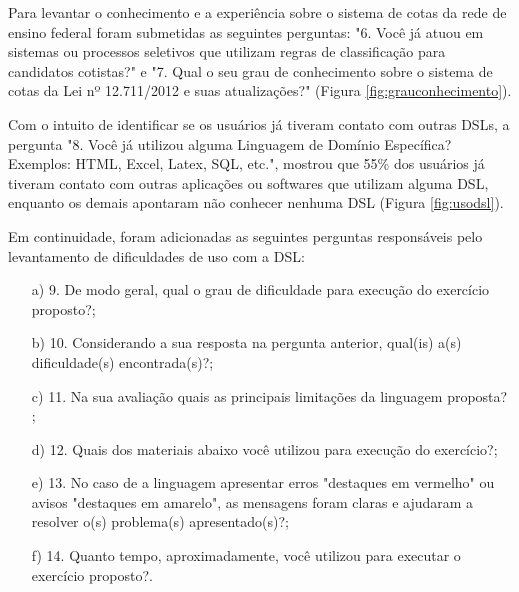 

\newpage
Para levantar o conhecimento e a experiência sobre o sistema de cotas da rede de ensino federal foram submetidas as seguintes perguntas: "6. Você já atuou em sistemas ou processos seletivos que utilizam regras de classificação para candidatos cotistas?" e "7. Qual o seu grau de conhecimento sobre o sistema de cotas da Lei nº 12.711/2012 e suas atualizações?" (Figura \ref{fig:grauconhecimento}).



Com o intuito de identificar se os usuários já tiveram contato com outras DSLs, a pergunta "8. Você já utilizou alguma Linguagem de Domínio Específica? Exemplos: HTML, Excel, Latex, SQL, etc.", mostrou que 55\% dos usuários já tiveram contato com outras aplicações ou softwares que utilizam alguma \gls{DSL}, enquanto os demais apontaram não conhecer nenhuma DSL (Figura \ref{fig:usodsl}).



\newpage
Em continuidade, foram adicionadas as seguintes perguntas responsáveis pelo levantamento de dificuldades de uso com a DSL:

\begin{enumerate}

    \item[a)] 9. De modo geral, qual o grau de dificuldade para execução do exercício proposto?;
    
    \item[b)] 10. Considerando a sua resposta na pergunta anterior, qual(is) a(s) dificuldade(s) encontrada(s)?;
    
    \item[c)] 11. Na sua avaliação quais as principais limitações da linguagem proposta?  ;
    
   \item[d)]  12. Quais dos materiais abaixo você utilizou para execução do exercício?;
   
   \item[e)] 13. No caso de a linguagem apresentar erros "destaques em vermelho" ou avisos "destaques em amarelo", as mensagens foram claras e ajudaram a resolver o(s) problema(s) apresentado(s)?;
   
   \item[f)] 14. Quanto tempo, aproximadamente, você utilizou para executar o exercício proposto?.   

\end{enumerate}

